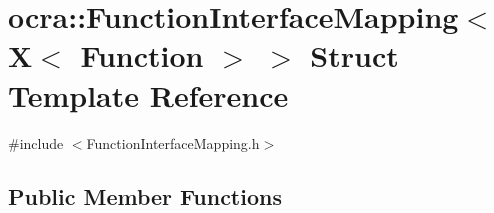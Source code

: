 \hypertarget{structocra_1_1FunctionInterfaceMapping_3_01X_3_01Function_01_4_01_4}{}\section{ocra\+:\+:Function\+Interface\+Mapping$<$ X$<$ Function $>$ $>$ Struct Template Reference}
\label{structocra_1_1FunctionInterfaceMapping_3_01X_3_01Function_01_4_01_4}


{\ttfamily \#include $<$Function\+Interface\+Mapping.\+h$>$}

\subsection*{Public Member Functions}

